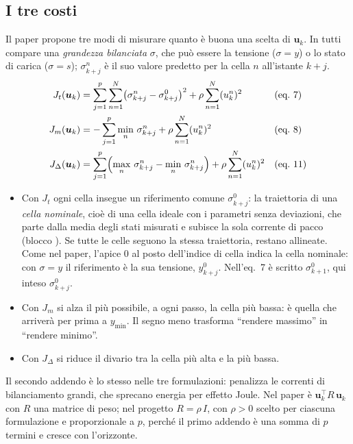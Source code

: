 \documentclass[11pt,a4paper]{article}
\newcommand{\file}[1]{\texttt{\detokenize{#1}}}
\newcommand{\vett}[1]{\boldsymbol{#1}}      %
\begin{document}
\subsection{I tre costi}

Il paper propone tre modi di misurare quanto è buona una scelta di $\vett{u}_k$. In
tutti compare una \emph{grandezza bilanciata} $\sigma$, che può essere la
tensione ($\sigma = y$) o lo stato di carica ($\sigma = s$);
$\sigma^n_{k+j}$ è il suo valore predetto per la cella $n$ all'istante $k+j$.
\begin{align}
  J_t(\vett{u}_k) &= \sum_{j=1}^{p} \sum_{n=1}^{N} \bigl(\sigma^n_{k+j} - \sigma^0_{k+j}\bigr)^2
            + \rho \sum_{n=1}^{N} (u^n_k)^2
     && \text{(eq.~7)} \label{eq:jt}\\
  J_m(\vett{u}_k) &= -\sum_{j=1}^{p} \min_{n}\, \sigma^n_{k+j}
            + \rho \sum_{n=1}^{N} (u^n_k)^2
     && \text{(eq.~8)} \label{eq:jm}\\
  J_\Delta(\vett{u}_k) &= \sum_{j=1}^{p} \Bigl(\max_{n}\, \sigma^n_{k+j}
                 - \min_{n}\, \sigma^n_{k+j}\Bigr)
            + \rho \sum_{n=1}^{N} (u^n_k)^2
     && \text{(eq.~11)} \label{eq:jd}
\end{align}
\begin{itemize}
  \item Con $J_t$ ogni cella insegue un riferimento comune $\sigma^0_{k+j}$:
        la traiettoria di una \emph{cella nominale}, cioè di una cella ideale
        con i parametri senza deviazioni, che parte dalla media degli stati
        misurati e subisce la sola corrente di pacco (blocco
        \file{Cella_nominale}). Se tutte le celle seguono la stessa
        traiettoria, restano allineate. Come nel paper, l'apice 0 al posto
        dell'indice di cella indica la cella nominale: con $\sigma = y$ il
        riferimento è la sua tensione, $y^0_{k+j}$. Nell'eq.~7 è scritto
        $\sigma^0_{k+1}$, qui inteso $\sigma^0_{k+j}$.
  \item Con $J_m$ si alza il più possibile, a ogni passo, la cella più bassa:
        è quella che arriverà per prima a $y_{\min}$. Il segno meno trasforma
        ``rendere massimo'' in ``rendere minimo''.
  \item Con $J_\Delta$ si riduce il divario tra la cella più alta e la più
        bassa.
\end{itemize}
Il secondo addendo è lo stesso nelle tre formulazioni: penalizza le correnti
di bilanciamento grandi, che sprecano energia per effetto Joule. Nel paper è
$\vett{u}_k^\top R\, \vett{u}_k$ con $R$ una matrice di peso; nel progetto $R = \rho\, I$, con
$\rho > 0$ scelto per ciascuna formulazione e proporzionale a $p$, perché il
primo addendo è una somma di $p$ termini e cresce con l'orizzonte.
\end{document}
